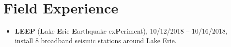 \section*{Field Experience}
\begin{itemize}
\item \textbf{LEEP} (\textbf{L}ake \textbf{E}rie \textbf{E}arthquake ex\textbf{P}eriment),
      10/12/2018 -- 10/16/2018, install 8 broadband seismic stations around Lake Erie.
\end{itemize}
